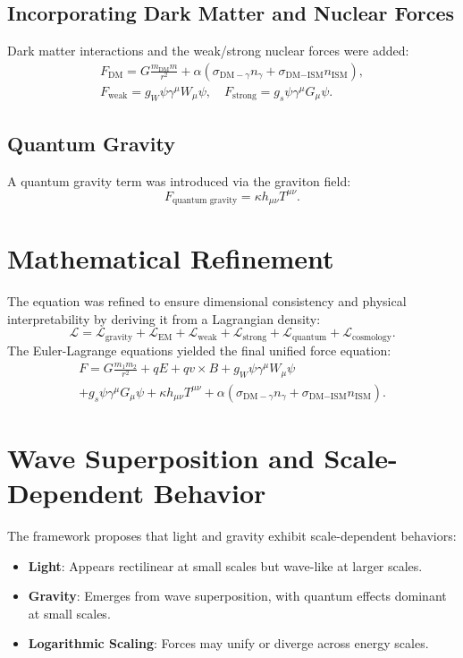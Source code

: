 \documentclass{article}
\begin{document}
\subsection{Incorporating Dark Matter and Nuclear Forces}
Dark matter interactions and the weak/strong nuclear forces were added:
\begin{multline*}
F_{\text{DM}} = G \frac{m_{\text{DM}} m}{r^2} + \alpha \left( \sigma_{\text{DM}-\gamma} n_{\gamma} + \sigma_{\text{DM}-\text{ISM}} n_{\text{ISM}} \right), \\
F_{\text{weak}} = g_W \psi \gamma^\mu W_\mu \psi, \quad F_{\text{strong}} = g_s \psi \gamma^\mu G_\mu \psi.
\end{multline*}

\subsection{Quantum Gravity}
A quantum gravity term was introduced via the graviton field:
\[
F_{\text{quantum gravity}} = \kappa h_{\mu\nu} T^{\mu\nu}.
\]

\section{Mathematical Refinement}
The equation was refined to ensure dimensional consistency and physical interpretability by deriving it from a Lagrangian density:
\[
\mathcal{L} = \mathcal{L}_{\text{gravity}} + \mathcal{L}_{\text{EM}} + \mathcal{L}_{\text{weak}} + \mathcal{L}_{\text{strong}} + \mathcal{L}_{\text{quantum}} + \mathcal{L}_{\text{cosmology}}.
\]
The Euler-Lagrange equations yielded the final unified force equation:
\begin{multline*}
F = G\frac{m_1 m_2}{r^2} + qE + qv \times B + g_W \psi \gamma^\mu W_\mu \psi \\
+ g_s \psi \gamma^\mu G_\mu \psi + \kappa h_{\mu\nu} T^{\mu\nu} + \alpha \left( \sigma_{\text{DM}-\gamma} n_{\gamma} + \sigma_{\text{DM}-\text{ISM}} n_{\text{ISM}} \right).
\end{multline*}

\section{Wave Superposition and Scale-Dependent Behavior}
The framework proposes that light and gravity exhibit scale-dependent behaviors:
\begin{itemize}
    \item \textbf{Light}: Appears rectilinear at small scales but wave-like at larger scales.
    \item \textbf{Gravity}: Emerges from wave superposition, with quantum effects dominant at small scales.
    \item \textbf{Logarithmic Scaling}: Forces may unify or diverge across energy scales.
\end{itemize}
\end{document}
